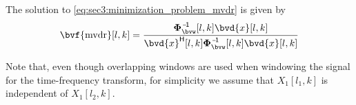 The solution to \cref{eq:sec3:minimization_problem_mvdr} is given by
\begin{equation}
	\label{eq:sec3:solution_mvdr_beamformer}
	\bvf{\mvdr}[l,k] = \frac{ \inv{\Corr{\bvw}}[l,k] \bvd{x}[l,k] }{ \he{\bvd{x}}[l,k] \inv{\Corr{\bvw}}[l,k] \bvd{x}[l,k] }
\end{equation}

Note that, even though overlapping windows are used when windowing the signal for the time-frequency transform, for simplicity we assume that $X_1[l_1,k]$ is independent of $X_1[l_2,k]$.


%
%
